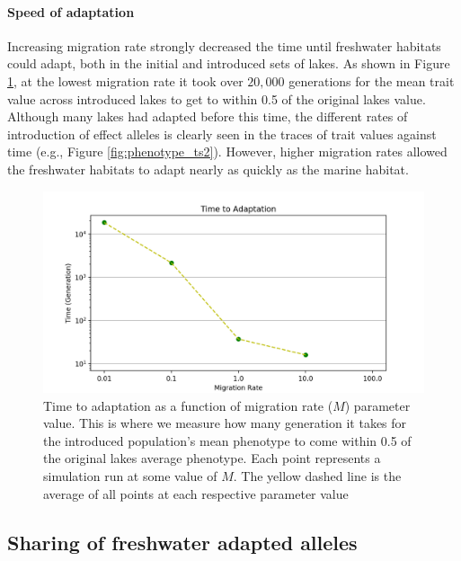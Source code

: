 \documentclass{article}
\begin{document}
\paragraph*{Speed of adaptation}
Increasing migration rate strongly decreased the time until freshwater habitats could adapt,
both in the initial and introduced sets of lakes.
As shown in Figure \ref{fig:TimeToAdaptation}, at the lowest migration rate 
it took over $20,000$ generations for the mean trait value across introduced lakes to 
get to within 0.5 of the original lakes value.
Although many lakes had adapted before this time,
the different rates of introduction of effect alleles is clearly seen in the traces
of trait values against time (e.g., Figure \ref{fig:phenotype_ts2}).
However, higher migration rates allowed the freshwater habitats to adapt
nearly as quickly as the marine habitat.


\begin{figure}
	\begin{center}
  		\includegraphics[width=1.0\linewidth]{semi_final_plots/T_adapt_semi_final.png}
  		\caption{Time to adaptation as a function of migration rate ($M$) parameter value. This is where we measure how many generation
		it takes for the introduced population's mean phenotype to come within 0.5 of the original lakes average phenotype. 
		Each point represents a simulation run at some value of $M$. 
		The yellow dashed line is the average of all points at each respective parameter value}
  		\label{fig:TimeToAdaptation}
	\end{center}
\end{figure}


\subsection*{Sharing of freshwater adapted alleles}
\end{document}
